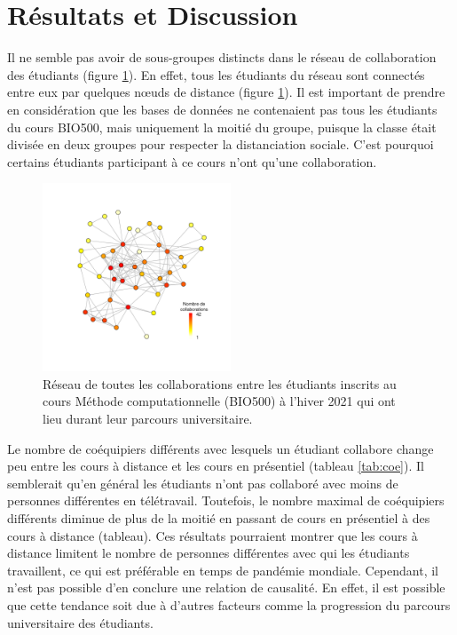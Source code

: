 \documentclass{article}
\begin{document}
\section*{Résultats et Discussion}
    Il ne semble pas avoir de sous-groupes distincts dans le réseau de collaboration des étudiants (figure \ref{fig:re}). En effet, tous les étudiants du réseau sont connectés entre eux par quelques nœuds de distance (figure \ref{fig:re}). Il est important de prendre en considération que les bases de données ne contenaient pas tous les étudiants du cours BIO500, mais uniquement la moitié du groupe, puisque la classe était divisée en deux groupes pour respecter la distanciation sociale. C’est pourquoi certains étudiants participant à ce cours n’ont qu’une collaboration.
\begin{figure}[h]
\centering
\includegraphics[width=0.5\textwidth]{figure_reseau_bio500.pdf}
\caption{Réseau de toutes les collaborations entre les étudiants inscrits au cours Méthode computationnelle (BIO500) à l'hiver 2021 qui ont lieu durant leur parcours universitaire.}
\label{fig:re}
\end{figure}
\hfill \break
    Le nombre de coéquipiers différents avec lesquels un étudiant collabore change peu entre les cours à distance et les cours en présentiel (tableau \ref{tab:coe}). Il semblerait qu’en général les étudiants n’ont pas collaboré avec moins de personnes différentes en télétravail. Toutefois, le nombre maximal de coéquipiers différents diminue de plus de la moitié en passant de cours en présentiel à des cours à distance (tableau). Ces résultats pourraient montrer que les cours à distance limitent le nombre de personnes différentes avec qui les étudiants travaillent, ce qui est préférable en temps de pandémie mondiale. Cependant, il n’est pas possible d’en conclure une relation de causalité. En effet, il est possible que cette tendance soit due à d’autres facteurs comme la progression du parcours universitaire des étudiants.
\end{document}
